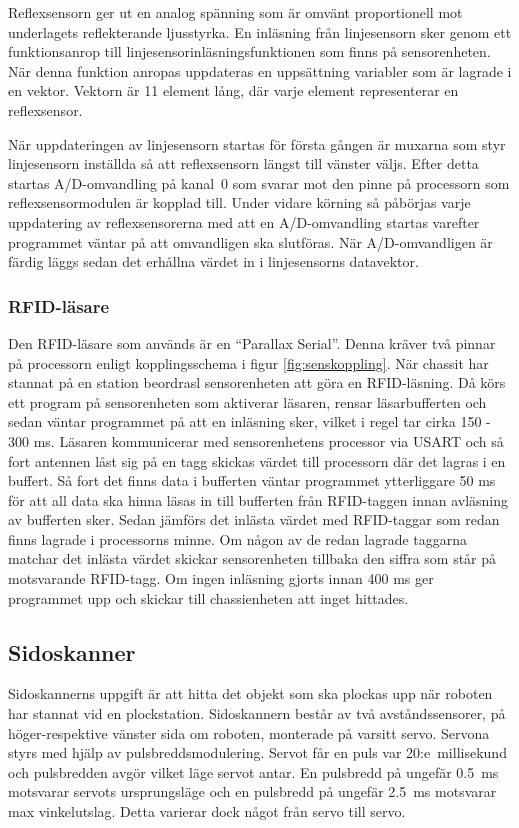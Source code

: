 Reflexsensorn ger ut en analog spänning som är omvänt proportionell mot underlagets reflekterande ljusstyrka. En inläsning från linjesensorn sker genom ett funktionsanrop till linjesensorinläsningsfunktionen som finns på sensorenheten. När denna funktion anropas uppdateras en uppsättning variabler som är lagrade i en vektor. Vektorn är 11 element lång, där varje element representerar en reflexsensor.

När uppdateringen av linjesensorn startas för första gången är muxarna som styr linjesensorn inställda så att reflexsensorn längst till vänster väljs. Efter detta startas A/D-omvandling på kanal~0 som svarar mot den pinne på processorn som reflexsensormodulen är kopplad till. Under vidare körning så påbörjas varje uppdatering av reflexsensorerna med att en A/D-omvandling startas varefter programmet väntar på att omvandligen ska slutföras. När A/D-omvandligen är färdig läggs sedan det erhållna värdet in i linjesensorns datavektor.


\subsubsection{RFID-läsare}
Den RFID-läsare som används är en “Parallax Serial”. Denna kräver två pinnar på processorn enligt kopplingsschema i figur \ref{fig:senskoppling}. När chassit har stannat på en station beordrasl sensorenheten att göra en RFID-läsning. Då körs ett program på sensorenheten som aktiverar läsaren, rensar läsarbufferten och sedan väntar programmet på att en inläsning sker, vilket i regel tar cirka 150 - 300 ms. Läsaren kommunicerar med sensorenhetens processor via USART och så fort antennen låst sig på en tagg skickas värdet till processorn där det lagras i en buffert. Så fort det finns data i bufferten väntar programmet ytterliggare 50 ms för att all data ska hinna läsas in till bufferten från RFID-taggen innan avläsning av bufferten sker. Sedan jämförs det inlästa värdet med RFID-taggar som redan finns lagrade i processorns minne. Om någon av de redan lagrade taggarna matchar det inlästa värdet skickar sensorenheten tillbaka den siffra som står på motsvarande RFID-tagg. Om ingen inläsning gjorts innan 400 ms ger programmet upp och skickar till chassienheten att inget hittades.

\subsection{Sidoskanner}
Sidoskannerns uppgift är att hitta det objekt som ska plockas upp när roboten har stannat vid en plockstation. Sidoskannern består av två avståndssensorer, på höger-respektive vänster sida om roboten, monterade på varsitt servo. Servona styrs med hjälp av pulsbreddsmodulering. Servot får en puls var 20:e~millisekund och pulsbredden avgör vilket läge servot antar. En pulsbredd på ungefär 0.5~ms motsvarar servots ursprungsläge och en pulsbredd på ungefär 2.5~ms motsvarar max vinkelutslag. Detta varierar dock något från servo till servo.

